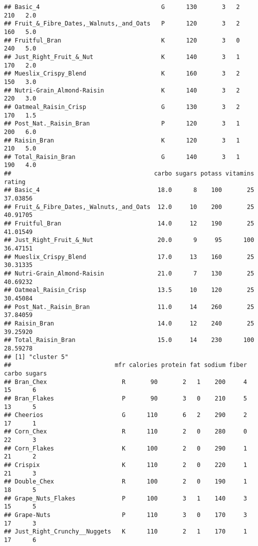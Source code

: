 \documentclass[
]{article}
\begin{document}
\begin{verbatim}
## Basic_4                                  G      130       3   2    210   2.0
## Fruit_&_Fibre_Dates,_Walnuts,_and_Oats   P      120       3   2    160   5.0
## Fruitful_Bran                            K      120       3   0    240   5.0
## Just_Right_Fruit_&_Nut                   K      140       3   1    170   2.0
## Mueslix_Crispy_Blend                     K      160       3   2    150   3.0
## Nutri-Grain_Almond-Raisin                K      140       3   2    220   3.0
## Oatmeal_Raisin_Crisp                     G      130       3   2    170   1.5
## Post_Nat._Raisin_Bran                    P      120       3   1    200   6.0
## Raisin_Bran                              K      120       3   1    210   5.0
## Total_Raisin_Bran                        G      140       3   1    190   4.0
##                                        carbo sugars potass vitamins   rating
## Basic_4                                 18.0      8    100       25 37.03856
## Fruit_&_Fibre_Dates,_Walnuts,_and_Oats  12.0     10    200       25 40.91705
## Fruitful_Bran                           14.0     12    190       25 41.01549
## Just_Right_Fruit_&_Nut                  20.0      9     95      100 36.47151
## Mueslix_Crispy_Blend                    17.0     13    160       25 30.31335
## Nutri-Grain_Almond-Raisin               21.0      7    130       25 40.69232
## Oatmeal_Raisin_Crisp                    13.5     10    120       25 30.45084
## Post_Nat._Raisin_Bran                   11.0     14    260       25 37.84059
## Raisin_Bran                             14.0     12    240       25 39.25920
## Total_Raisin_Bran                       15.0     14    230      100 28.59278
## [1] "cluster 5"
##                             mfr calories protein fat sodium fiber carbo sugars
## Bran_Chex                     R       90       2   1    200     4    15      6
## Bran_Flakes                   P       90       3   0    210     5    13      5
## Cheerios                      G      110       6   2    290     2    17      1
## Corn_Chex                     R      110       2   0    280     0    22      3
## Corn_Flakes                   K      100       2   0    290     1    21      2
## Crispix                       K      110       2   0    220     1    21      3
## Double_Chex                   R      100       2   0    190     1    18      5
## Grape_Nuts_Flakes             P      100       3   1    140     3    15      5
## Grape-Nuts                    P      110       3   0    170     3    17      3
## Just_Right_Crunchy__Nuggets   K      110       2   1    170     1    17      6

\end{verbatim}
\end{document}
